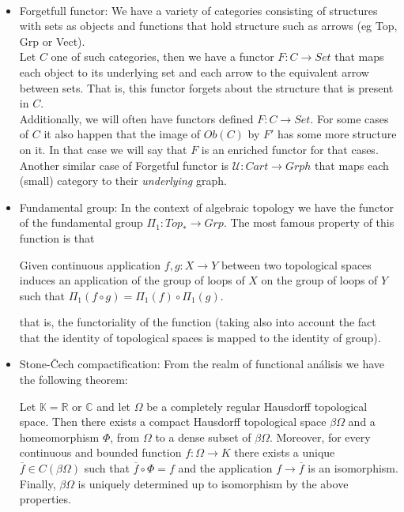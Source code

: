 \begin{example}\ 
  \begin{itemize}
  \item {Forgetfull functor}: We have a variety of categories consisting of structures with sets as objects and functions that hold structure such as arrows (eg Top, Grp or Vect).\\
    
    Let $C$ one of such  categories, then we have a functor $F:C\to Set$ that maps each object to its underlying set and each arrow to the equivalent arrow between sets. That is, this functor forgets about the structure that is present in $C$.\\

    Additionally, we will often have functors defined $F:C\to Set$. For some cases of $C$ it also happen that the image of $Ob(C)$ by $F'$ has some more structure on it. In that case we will say that $F$ is an enriched functor for that cases.\\

    Another similar case of Forgetful functor is $\mathcal{U}:Cart \to Grph$ that maps each (small) category to their \emph{underlying} graph. 
  \item Fundamental group: In the context of algebraic topology we have the functor of the fundamental group $\Pi_1: Top_* \to Grp$. The most famous property of this function is that

    
      Given continuous application $ f,g:X \to Y$ between two topological spaces induces an application of the group of loops of $X$ on the group of loops of $Y$ such that $\Pi_1(f \circ g) = \Pi_1(f) \circ \Pi_1(g)$.

    that is, the functoriality of the function (taking also into account the fact that the identity of topological spaces is mapped to the identity of group). 

  \item Stone-\v{C}ech compactification\label{example:stone-cech}:  From the realm of functional análisis we have the following theorem:

    \begin{theorem} Let $\mathbb{K}=\mathbb R $ or $\mathbb C$ and let $\Omega$ be a completely regular Hausdorff topological space. Then there exists a compact Hausdorff topological space $\beta \Omega$ and a homeomorphism $\Phi$, from $\Omega$ to a dense subset of $\beta\Omega$. Moreover, for every continuous and bounded function $f: \Omega \to K$ there exists a unique $\overline{f} \in C(\beta \Omega)$ such that $\overline{f}\circ \Phi = f$ and the application $f \to \overline{f}$ is an isomorphism. Finally, $\beta \Omega$ is uniquely determined up to isomorphism by the above properties.
    \end{theorem}


\end{itemize}
\end{example}
